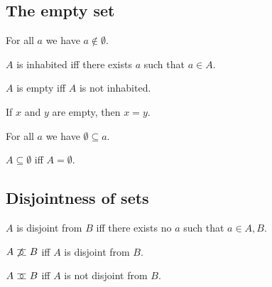 \subsection{The empty set}

\begin{axiom}%
\label{notin_emptyset}
    For all $a$ we have $a\notin\emptyset$.
\end{axiom}

\begin{definition}\label{inhabited}
    $A$ is inhabited iff
    there exists $a$ such that $a\in A$.
\end{definition}

\begin{abbreviation}\label{empty}
    $A$ is empty iff $A$ is not inhabited.
\end{abbreviation}


\begin{proposition}%
\label{empty_eq}
    If $x$ and $y$ are empty, then $x = y$.
\end{proposition}

\begin{proposition}%
\label{emptyset_subseteq}
    For all $a$ we have $\emptyset \subseteq a$.
\end{proposition}

\begin{proposition}%
\label{subseteq_emptyset_iff}
    $A\subseteq \emptyset$ iff $A = \emptyset$.
\end{proposition}


\subsection{Disjointness of sets}

\begin{definition}\label{disjoint}
    $A$ is disjoint from $B$ iff there exists no $a$ such that $a\in A, B$.
\end{definition}

\begin{abbreviation}\label{notmeets}
    $A\mathrel{\not\mathrel{\supset\!\!\!\subset}} B$ iff $A$ is disjoint from $B$.
\end{abbreviation}

\begin{abbreviation}\label{meets}
    $A\mathrel{\supset\!\!\!\subset} B$ iff $A$ is not disjoint from $B$.
\end{abbreviation}

